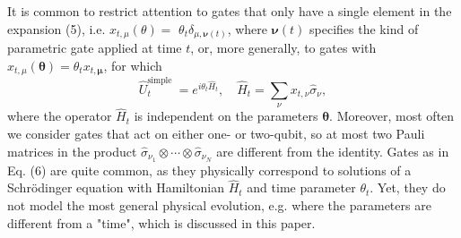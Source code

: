 It is common to restrict attention to gates that only have a single element in the expansion (5), i.e. $x_{t, \mu}(\theta)=$ $\theta_t \delta_{\mu, \boldsymbol{\nu}(t)}$, where $\boldsymbol{\nu}(t)$ specifies the kind of parametric gate applied at time $t$, or, more generally, to gates with $x_{t, \mu}(\boldsymbol{\theta})=\theta_t x_{t, \boldsymbol{\mu}}$, for which
\begin{equation}
    \hat{U}_t^{\text {simple }}=e^{i \theta_t \hat{H}_t}, \quad \hat{H}_t=\sum_\nu x_{t, \nu} \hat{\sigma}_\nu,
\end{equation}
where the operator $\hat{H}_t$ is independent on the parameters $\boldsymbol{\theta}$. Moreover, most often we consider gates that act on either one- or two-qubit, so at most two Pauli matrices in the product $\hat{\sigma}_{\nu_1} \otimes \cdots \otimes \hat{\sigma}_{\nu_N}$ are different from the identity. Gates as in Eq. (6) are quite common, as they physically correspond to solutions of a Schrödinger equation with Hamiltonian $\hat{H}_t$ and time parameter $\theta_t$. Yet, they do not model the most general physical evolution, e.g. where the parameters are different from a "time", which is discussed in this paper.

